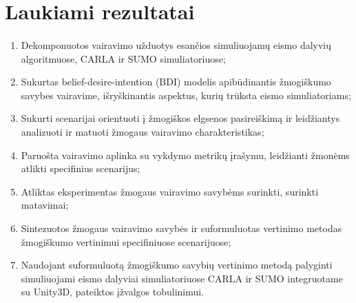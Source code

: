 \documentclass{beamer}
\begin{document}
\section{Laukiami rezultatai}
\begingroup
\small%
\begin{frame}{\insertsection}
\framesubtitle{\insertsubsection}
\vspace{-30.5pt}
\begin{enumerate}
	\item Dekomponuotos vairavimo užduotys esančios simuliuojamų eismo dalyvių algoritmuose, CARLA ir SUMO simuliatoriuose;
	\item Sukurtas belief-desire-intention (BDI) modelis apibūdinantis žmogiškumo savybes vairavime, išryškinantis aspektus, kurių trūksta eismo simuliatoriams;
	\item Sukurti scenarijai orientuoti į žmogiškos elgsenos pasireiškimą ir leidžiantys analizuoti ir matuoti žmogaus vairavimo charakteristikas;
	\item Paruošta vairavimo aplinka su vykdymo metrikų įrašymu, leidžianti žmonėms atlikti specifinius scenarijus;
	\item Atliktas eksperimentas žmogaus vairavimo savybėms surinkti, surinkti matavimai;
	\item Sintezuotos žmogaus vairavimo savybės ir suformuluotas vertinimo metodas žmogiškumo vertinimui specifiniuose scenarijuose;
	\item Naudojant suformuluotą žmogiškumo savybių vertinimo metodą palyginti simuliuojami eismo dalyviai simuliatoriuose CARLA ir SUMO integruotame su Unity3D, pateiktos įžvalgos tobulinimui.
\end{enumerate}
\end{frame}
\endgroup


%
\end{document}
